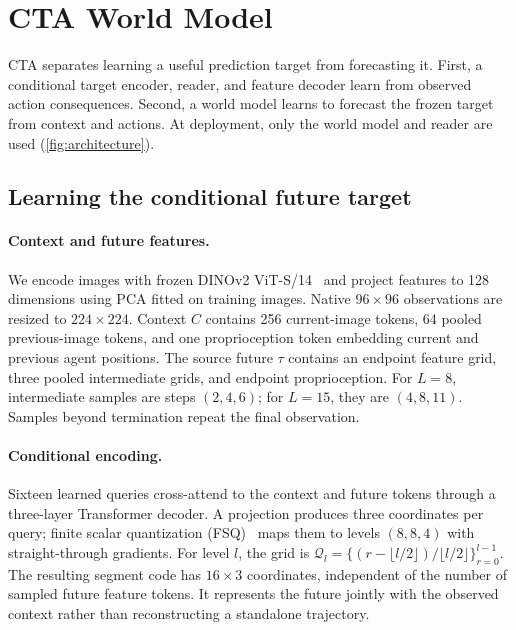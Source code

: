 \section{CTA World Model}
\label{sec:method}
CTA separates learning a useful prediction target from forecasting it. First, a conditional target encoder, reader, and feature decoder learn from observed action consequences. Second, a world model learns to forecast the frozen target from context and actions. At deployment, only the world model and reader are used (\cref{fig:architecture}).

\subsection{Learning the conditional future target}
\label{sec:source}
\paragraph{Context and future features.}
We encode images with frozen DINOv2 ViT-S/14~\cite{oquab2024dinov2} and project features to 128 dimensions using PCA fitted on training images. Native $96\times96$ observations are resized to $224\times224$. Context $C$ contains 256 current-image tokens, 64 pooled previous-image tokens, and one proprioception token embedding current and previous agent positions. The source future $\tau$ contains an endpoint feature grid, three pooled intermediate grids, and endpoint proprioception. For $L=8$, intermediate samples are steps $(2,4,6)$; for $L=15$, they are $(4,8,11)$. Samples beyond termination repeat the final observation.

\paragraph{Conditional encoding.}
Sixteen learned queries cross-attend to the context and future tokens through a three-layer Transformer decoder. A projection produces three coordinates per query; finite scalar quantization (FSQ)~\cite{mentzer2024fsq} maps them to levels $(8,8,4)$ with straight-through gradients. For level $l$, the grid is $\mathcal Q_l=\{(r-\lfloor l/2\rfloor)/\lfloor l/2\rfloor\}_{r=0}^{l-1}$. The resulting segment code has $16\times3$ coordinates, independent of the number of sampled future feature tokens. It represents the future jointly with the observed context rather than reconstructing a standalone trajectory.

